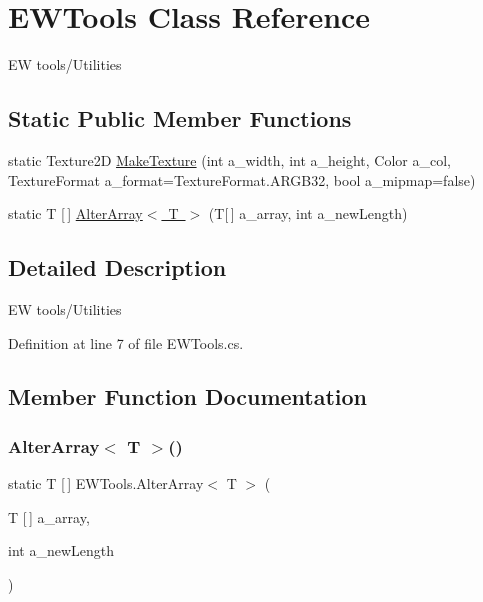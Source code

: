 \hypertarget{class_e_w_tools}{}\section{E\+W\+Tools Class Reference}
\label{class_e_w_tools}


EW tools/\+Utilities  


\subsection*{Static Public Member Functions}
\begin{DoxyCompactItemize}
\item 
static Texture2D \mbox{\hyperlink{class_e_w_tools_a89000b0bd5af7cad18643ea6e1bcc661}{Make\+Texture}} (int a\+\_\+width, int a\+\_\+height, Color a\+\_\+col, Texture\+Format a\+\_\+format=Texture\+Format.\+A\+R\+G\+B32, bool a\+\_\+mipmap=false)
\item 
static T \mbox{[}$\,$\mbox{]} \mbox{\hyperlink{class_e_w_tools_a8ab84e5a1ca8623466d8bc953266dca4}{Alter\+Array$<$ T $>$}} (T\mbox{[}$\,$\mbox{]} a\+\_\+array, int a\+\_\+new\+Length)
\end{DoxyCompactItemize}


\subsection{Detailed Description}
EW tools/\+Utilities 



Definition at line 7 of file E\+W\+Tools.\+cs.



\subsection{Member Function Documentation}
\mbox{\label{class_e_w_tools_a8ab84e5a1ca8623466d8bc953266dca4}} 
\subsubsection{\texorpdfstring{Alter\+Array$<$ T $>$()}{AlterArray< T >()}}
{\footnotesize\ttfamily static T \mbox{[}$\,$\mbox{]} E\+W\+Tools.\+Alter\+Array$<$ T $>$ (\begin{DoxyParamCaption}\item[{T \mbox{[}$\,$\mbox{]}}]{a\+\_\+array,  }\item[{int}]{a\+\_\+new\+Length }\end{DoxyParamCaption})\hspace{0.3cm}{\ttfamily [static]}}



